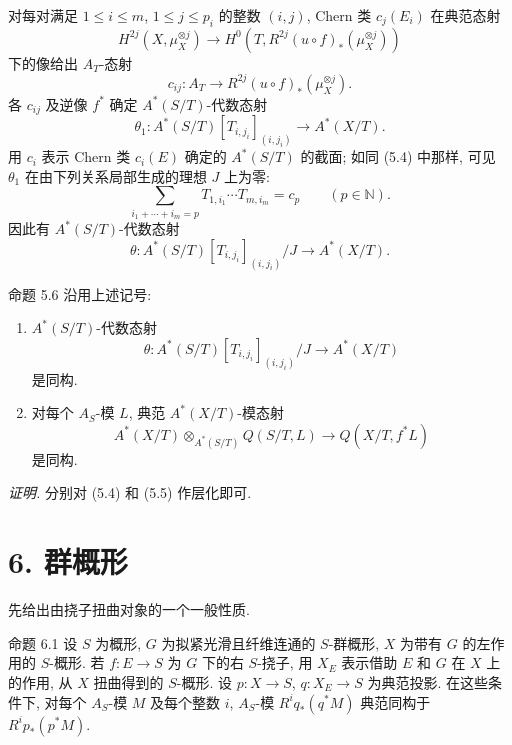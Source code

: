 对每对满足 $1\le i\le m$, $1\le j\le p_i$ 的整数 $(i,j)$, Chern 类 $c_j(E_i)$ 在典范态射
\[
H^{2j}(X,\mu_X^{\otimes j})
\to H^0(T,R^{2j}(u\circ f)_*(\mu_X^{\otimes j}))
\]
下的像给出 $A_T$-态射
\[
c_{ij}:A_T\to R^{2j}(u\circ f)_*(\mu_X^{\otimes j}).
\]
各 $c_{ij}$ 及逆像 $f^*$ 确定 $A^*(S/T)$-代数态射
\[
\theta_1:A^*(S/T)[T_{i,j_i}]_{(i,j_i)}\to A^*(X/T).
\]
用 $c_i$ 表示 Chern 类 $c_i(E)$ 确定的 $A^*(S/T)$ 的截面; 如同 (5.4) 中那样, 可见 $\theta_1$ 在由下列关系局部生成的理想 $J$ 上为零:
\[
\sum_{i_1+\cdots+i_m=p}T_{1,i_1}\cdots T_{m,i_m}=c_p\qquad(p\in\mathbb N).
\]
因此有 $A^*(S/T)$-代数态射
\[
\theta:A^*(S/T)[T_{i,j_i}]_{(i,j_i)}/J\to A^*(X/T).
\]

\begin{statement}{命题 5.6}
沿用上述记号:
\begin{enumerate}[label=\alph*)]
\item $A^*(S/T)$-代数态射
\[
\theta:A^*(S/T)[T_{i,j_i}]_{(i,j_i)}/J\to A^*(X/T)
\]
是同构.
\item 对每个 $A_S$-模 $L$, 典范 $A^*(X/T)$-模态射
\[
A^*(X/T)\otimes_{A^*(S/T)}Q(S/T,L)\to Q(X/T,f^*L)
\]
是同构.
\end{enumerate}
\end{statement}

\emph{证明.} 分别对 (5.4) 和 (5.5) 作层化即可.

\section*{6. 群概形}

先给出由挠子扭曲对象的一个一般性质.

\begin{statement}{命题 6.1}
设 $S$ 为概形, $G$ 为拟紧光滑且纤维连通的 $S$-群概形, $X$ 为带有 $G$ 的左作用的 $S$-概形. 若 $f:E\to S$ 为 $G$ 下的右 $S$-挠子, 用 $X_E$ 表示借助 $E$ 和 $G$ 在 $X$ 上的作用, 从 $X$ 扭曲得到的 $S$-概形. 设 $p:X\to S$, $q:X_E\to S$ 为典范投影. 在这些条件下, 对每个 $A_S$-模 $M$ 及每个整数 $i$, $A_S$-模 $R^iq_*(q^*M)$ 典范同构于 $R^ip_*(p^*M)$.
\end{statement}

